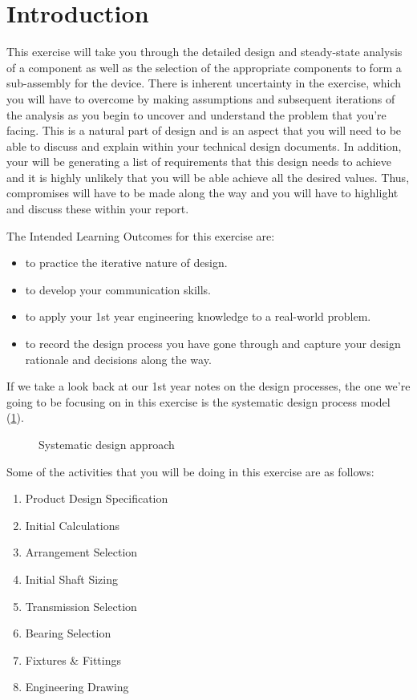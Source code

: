 \section{Introduction}

This exercise will take you through the detailed design and steady-state analysis of a component as well as the selection of the appropriate components to form a sub-assembly for the device. 
There is inherent uncertainty in the exercise, which you will have to overcome by making assumptions and subsequent iterations of the analysis as you begin to uncover and understand the problem that you're facing. 
This is a natural part of design and is an aspect that you will need to be able to discuss and explain within your technical design documents. 
In addition, your will be generating a list of requirements that this design needs to achieve and it is highly unlikely that you will be able achieve all the desired values. 
Thus, compromises will have to be made along the way and you will have to highlight and discuss these within your report.

The Intended Learning Outcomes for this exercise are:

\begin{itemize}
  \item to practice the iterative nature of design.
  \item to develop your communication skills.
  \item to apply your 1st year engineering knowledge to a real-world problem.
  \item to record the design process you have gone through and capture your design rationale and decisions along the way.
\end{itemize}

If we take a look back at our 1st year notes on the design processes, the one we're going to be focusing on in this exercise is the systematic design process model (\cref{fig-vdi}).

\begin{figure}[h!]
  \centering
  \resizebox{0.9\textwidth}{!}{
    
  }
  \caption[Systematic design approach]{Systematic design approach~\citep{pahl2013}}\label{fig-vdi}
\end{figure}

Some of the activities that you will be doing in this exercise are as follows:

\begin{enumerate}
  \item Product Design Specification
  \item Initial Calculations
  \item Arrangement Selection
  \item Initial Shaft Sizing
  \item Transmission Selection
  \item Bearing Selection
  \item Fixtures \& Fittings
  \item Engineering Drawing
\end{enumerate}

